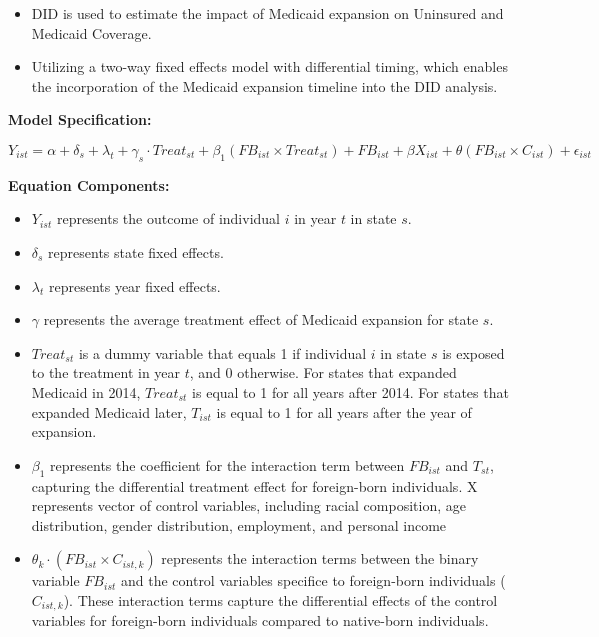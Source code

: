 \documentclass[
]{article}
\providecommand{\tightlist}{%
  \setlength{\itemsep}{0pt}\setlength{\parskip}{0pt}}
\begin{document}
\begin{itemize}
\tightlist
\item
  DID is used to estimate the impact of Medicaid expansion on Uninsured
  and Medicaid Coverage.
\item
  Utilizing a two-way fixed effects model with differential timing,
  which enables the incorporation of the Medicaid expansion timeline
  into the DID analysis.
\end{itemize}

\textbf{Model Specification:}

\begin{equation}
Y_{ist} = \alpha + \delta_s + \lambda_t + \gamma_s \cdot Treat_{st} + \beta_1 (FB_{ist} \times Treat_{st}) + FB_{ist} + \beta  X_{ist} + \theta(FB_{ist} \times C_{ist}) + \epsilon_{ist}
\end{equation}

\textbf{Equation Components:}

\begin{itemize}
\tightlist
\item
  \(Y_{ist}\) represents the outcome of individual \(i\) in year \(t\)
  in state \(s\).
\item
  \(\delta_s\) represents state fixed effects.
\item
  \(\lambda_t\) represents year fixed effects.
\item
  \(\gamma\) represents the average treatment effect of Medicaid
  expansion for state \(s\).
\item
  \(Treat_{st}\) is a dummy variable that equals 1 if individual \(i\)
  in state \(s\) is exposed to the treatment in year \(t\), and 0
  otherwise. For states that expanded Medicaid in 2014, \(Treat_{st}\)
  is equal to 1 for all years after 2014. For states that expanded
  Medicaid later, \(T_{ist}\) is equal to 1 for all years after the year
  of expansion.
\item
  \(\beta_1\) represents the coefficient for the interaction term
  between \(FB_{ist}\) and \(T_{st}\), capturing the differential
  treatment effect for foreign-born individuals. X represents vector of
  control variables, including racial composition, age distribution,
  gender distribution, employment, and personal income
\item
  \(\theta_k \cdot (FB_{ist} \times C_{ist,k})\) represents the
  interaction terms between the binary variable \(FB_{ist}\) and the
  control variables specifice to foreign-born individuals
  (\(C_{ist,k}\)). These interaction terms capture the differential
  effects of the control variables for foreign-born individuals compared
  to native-born individuals.
\end{itemize}
\end{document}
